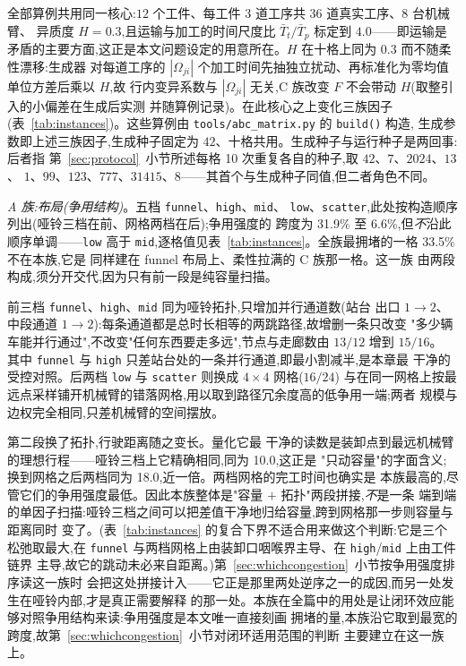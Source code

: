 \documentclass[manuscript,screen,review]{acmart}
\newcommand{\NSeeds}{10}
\newcommand{\ContentionLo}{6.6\%}
\newcommand{\ContentionHi}{33.5\%}
\newcommand{\ContentionAHi}{31.9\%}
\newcommand{\LegDumbbell}{10.0}          %
\newcommand{\LegGrid}{18.0}              %
\begin{document}
全部算例共用同一核心:$12$ 个工件、每工件 $3$ 道工序共 $36$ 道真实工序、$8$ 台机械臂、
异质度 $H=0.3$,且运输与加工的时间尺度比 $\bar{T}_t/\bar{T}_p$ 标定到 $4.0$——即运输是
矛盾的主要方面,这正是本文问题设定的用意所在。$H$ 在十格上同为 $0.3$ 而不随柔性漂移:生成器
对每道工序的 $|\Omega_{ji}|$ 个加工时间先抽独立扰动、再标准化为零均值单位方差后乘以 $H$,故
行内变异系数与 $|\Omega_{ji}|$ 无关,C 族改变 $F$ 不会带动 $H$(取整引入的小偏差在生成后实测
并随算例记录)。在此核心之上变化三族因子
(表~\ref{tab:instances})。这些算例由 \texttt{tools/abc\_matrix.py} 的 \texttt{build()} 构造,
生成参数即上述三族因子,生成种子固定为 $42$、十格共用。生成种子与运行种子是两回事:后者指
第~\ref{sec:protocol}~小节所述每格 \NSeeds{} 次重复各自的种子,取 $42$、$7$、$2024$、$13$、
$1$、$99$、$123$、$777$、$31415$、$8$——其首个与生成种子同值,但二者角色不同。

\emph{A 族:布局(争用结构)}。五档 \texttt{funnel}、\texttt{high}、\texttt{mid}、
\texttt{low}、\texttt{scatter},此处按构造顺序列出(哑铃三档在前、网格两档在后);争用强度的
跨度为 \ContentionAHi{} 至 \ContentionLo{},但\emph{不}沿此顺序单调——\texttt{low} 高于
\texttt{mid},逐格值见表~\ref{tab:instances}。全族最拥堵的一格 \ContentionHi{} 不在本族,它是
同样建在 funnel 布局上、柔性拉满的 C 族那一格。这一族
由两段构成,须分开交代,因为只有前一段是纯容量扫描。

前三档 \texttt{funnel}、\texttt{high}、\texttt{mid} 同为哑铃拓扑,只增加并行通道数(站台
出口 $1\to2$、中段通道 $1\to2$):每条通道都是总时长相等的两跳路径,故增删一条只改变
"多少辆车能并行通过",不改变"任何东西要走多远",节点与走廊数由 $13/12$ 增到 $15/16$。
其中 \texttt{funnel} 与 \texttt{high} 只差站台处的一条并行通道,即最小割减半,是本章最
干净的受控对照。后两档 \texttt{low} 与 \texttt{scatter} 则换成 $4\times4$ 网格($16/24$)
与在同一网格上按最远点采样铺开机械臂的错落网格,用以取到路径冗余度高的低争用一端;两者
规模与边权完全相同,只差机械臂的空间摆放。

第二段换了拓扑,行驶距离随之变长。量化它最
干净的读数是装卸点到最远机械臂的理想行程——哑铃三档上它精确相同,同为 \LegDumbbell{},这正是
"只动容量"的字面含义;换到网格之后两档同为 \LegGrid{},近一倍。两档网格的完工时间也确实是
本族最高的,尽管它们的争用强度最低。因此本族整体是"容量 $+$ 拓扑"两段拼接,\emph{不}是一条
端到端的单因子扫描:哑铃三档之间可以把差值干净地归给容量,跨到网格那一步则容量与距离同时
变了。(表~\ref{tab:instances} 的复合下界不适合用来做这个判断:它是三个松弛取最大,在
\texttt{funnel} 与两档网格上由装卸口咽喉界主导、在 \texttt{high}/\texttt{mid} 上由工件链界
主导,故它的跳动未必来自距离。)第~\ref{sec:whichcongestion}~小节按争用强度排序读这一族时
会把这处拼接计入——它正是那里两处逆序之一的成因,而另一处发生在哑铃内部,才是真正需要解释
的那一处。本族在全篇中的用处是让闭环效应能够对照争用结构来读:争用强度是本文唯一直接刻画
拥堵的量,本族沿它取到最宽的跨度,故第~\ref{sec:whichcongestion}~小节对闭环适用范围的判断
主要建立在这一族上。
\end{document}
